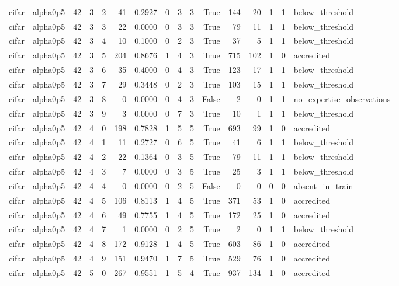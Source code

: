 \begin{tabular}{llrrrrrrrrrrrrrl}
cifar & alpha0p5 & 42 & 3 & 2 & 41 & 0.2927 & 0 & 3 & 3 & True & 144 & 20 & 1 & 1 & below\_threshold \\
cifar & alpha0p5 & 42 & 3 & 3 & 22 & 0.0000 & 0 & 3 & 3 & True & 79 & 11 & 1 & 1 & below\_threshold \\
cifar & alpha0p5 & 42 & 3 & 4 & 10 & 0.1000 & 0 & 2 & 3 & True & 37 & 5 & 1 & 1 & below\_threshold \\
cifar & alpha0p5 & 42 & 3 & 5 & 204 & 0.8676 & 1 & 4 & 3 & True & 715 & 102 & 1 & 0 & accredited \\
cifar & alpha0p5 & 42 & 3 & 6 & 35 & 0.4000 & 0 & 4 & 3 & True & 123 & 17 & 1 & 1 & below\_threshold \\
cifar & alpha0p5 & 42 & 3 & 7 & 29 & 0.3448 & 0 & 2 & 3 & True & 103 & 15 & 1 & 1 & below\_threshold \\
cifar & alpha0p5 & 42 & 3 & 8 & 0 & 0.0000 & 0 & 4 & 3 & False & 2 & 0 & 1 & 1 & no\_expertise\_observations \\
cifar & alpha0p5 & 42 & 3 & 9 & 3 & 0.0000 & 0 & 7 & 3 & True & 10 & 1 & 1 & 1 & below\_threshold \\
cifar & alpha0p5 & 42 & 4 & 0 & 198 & 0.7828 & 1 & 5 & 5 & True & 693 & 99 & 1 & 0 & accredited \\
cifar & alpha0p5 & 42 & 4 & 1 & 11 & 0.2727 & 0 & 6 & 5 & True & 41 & 6 & 1 & 1 & below\_threshold \\
cifar & alpha0p5 & 42 & 4 & 2 & 22 & 0.1364 & 0 & 3 & 5 & True & 79 & 11 & 1 & 1 & below\_threshold \\
cifar & alpha0p5 & 42 & 4 & 3 & 7 & 0.0000 & 0 & 3 & 5 & True & 25 & 3 & 1 & 1 & below\_threshold \\
cifar & alpha0p5 & 42 & 4 & 4 & 0 & 0.0000 & 0 & 2 & 5 & False & 0 & 0 & 0 & 0 & absent\_in\_train \\
cifar & alpha0p5 & 42 & 4 & 5 & 106 & 0.8113 & 1 & 4 & 5 & True & 371 & 53 & 1 & 0 & accredited \\
cifar & alpha0p5 & 42 & 4 & 6 & 49 & 0.7755 & 1 & 4 & 5 & True & 172 & 25 & 1 & 0 & accredited \\
cifar & alpha0p5 & 42 & 4 & 7 & 1 & 0.0000 & 0 & 2 & 5 & True & 2 & 0 & 1 & 1 & below\_threshold \\
cifar & alpha0p5 & 42 & 4 & 8 & 172 & 0.9128 & 1 & 4 & 5 & True & 603 & 86 & 1 & 0 & accredited \\
cifar & alpha0p5 & 42 & 4 & 9 & 151 & 0.9470 & 1 & 7 & 5 & True & 529 & 76 & 1 & 0 & accredited \\
cifar & alpha0p5 & 42 & 5 & 0 & 267 & 0.9551 & 1 & 5 & 4 & True & 937 & 134 & 1 & 0 & accredited \\

\end{tabular}
